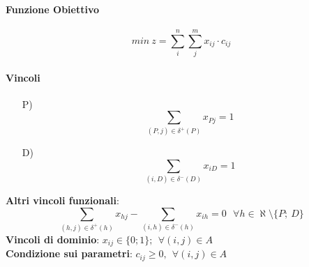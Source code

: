 \documentclass[12pt,a4paper]{article}
\begin{document}
\paragraph{Funzione Obiettivo} $$min\ z = \sum_i^n \sum_j^m x_{ij}\cdot c_{ij}$$
\paragraph{Vincoli}
\begin{enumerate}
\item[P)] $$\sum_{(P,j) \in \delta^+(P)} x_{Pj}=1$$
\item[D)] $$\sum_{(i,D) \in \delta^-(D)} x_{iD}=1$$
\end{enumerate}
\textbf{Altri vincoli funzionali}: $$\sum_{(h,j) \in \delta^+(h)} x_{hj} - \sum_{(i,h) \in \delta^-(h)} x_{ih}=0 \ \ \ \forall h \in \aleph \setminus \{P;\ D\}$$
\textbf{Vincoli di dominio}: $x_{ij} \in \{0;1\}; \ \ \forall (i,j) \in A$\\
\textbf{Condizione sui parametri}: $c_{ij} \geq 0,\ \ \forall (i,j) \in A$
\end{document}
